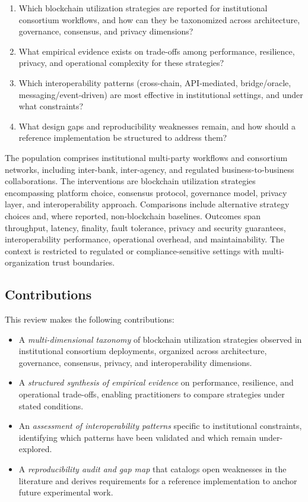 \documentclass[journal]{IEEEtran}
\begin{document}
\begin{enumerate}
  \item[\textbf{RQ1.}] Which blockchain utilization strategies are reported for institutional consortium workflows, and how can they be taxonomized across architecture, governance, consensus, and privacy dimensions?
  \item[\textbf{RQ2.}] What empirical evidence exists on trade-offs among performance, resilience, privacy, and operational complexity for these strategies?
  \item[\textbf{RQ3.}] Which interoperability patterns (cross-chain, API-mediated, bridge/oracle, messaging/event-driven) are most effective in institutional settings, and under what constraints?
  \item[\textbf{RQ4.}] What design gaps and reproducibility weaknesses remain, and how should a reference implementation be structured to address them?
\end{enumerate}

The population comprises institutional multi-party workflows and consortium networks, including inter-bank, inter-agency, and regulated business-to-business collaborations.
The interventions are blockchain utilization strategies encompassing platform choice, consensus protocol, governance model, privacy layer, and interoperability approach.
Comparisons include alternative strategy choices and, where reported, non-blockchain baselines.
Outcomes span throughput, latency, finality, fault tolerance, privacy and security guarantees, interoperability performance, operational overhead, and maintainability.
The context is restricted to regulated or compliance-sensitive settings with multi-organization trust boundaries.

\subsection{Contributions}

This review makes the following contributions:

\begin{itemize}
  \item A \emph{multi-dimensional taxonomy} of blockchain utilization strategies observed in institutional consortium deployments, organized across architecture, governance, consensus, privacy, and interoperability dimensions.
  \item A \emph{structured synthesis of empirical evidence} on performance, resilience, and operational trade-offs, enabling practitioners to compare strategies under stated conditions.
  \item An \emph{assessment of interoperability patterns} specific to institutional constraints, identifying which patterns have been validated and which remain under-explored.
  \item A \emph{reproducibility audit and gap map} that catalogs open weaknesses in the literature and derives requirements for a reference implementation to anchor future experimental work.
\end{itemize}
\end{document}
